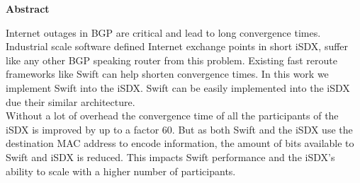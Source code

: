 \clearpage
\null
\vfil %
\thispagestyle{plain}
\begin{center}\textbf{Abstract}\end{center}
Internet outages in BGP are critical and lead to long convergence times. \\
Industrial scale software defined Internet exchange points in short iSDX, suffer like any other BGP speaking router from this problem. Existing fast reroute frameworks like Swift can help shorten convergence times. In this work we implement Swift into the iSDX. Swift can be easily implemented into the iSDX due their similar architecture. \\
Without a lot of overhead the convergence time of all the participants of the iSDX is improved by up to a factor $60$. But as both Swift and the iSDX use the destination MAC address to encode information, the amount of bits available to Swift and iSDX is reduced. This impacts Swift performance and the iSDX's ability to scale with a higher number of participants.
\vfil
\clearpage 
